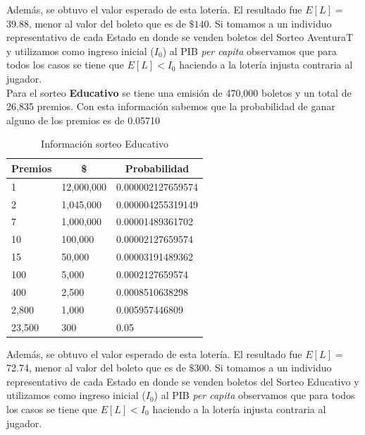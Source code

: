 Además, se obtuvo el valor esperado de esta lotería. El resultado fue $E[L] =$ 39.88, menor al valor del boleto que es de $\$ 140$. Si tomamos a un individuo representativo de cada Estado en donde se venden boletos del Sorteo AventuraT y utilizamos como ingreso inicial ($I_0$) al PIB \textit{per capita} observamos que para todos los casos se tiene que $E[L] < I_0$ haciendo a la lotería injusta contraria al jugador. \\

Para el sorteo \textbf{Educativo} se tiene una emisión de 470,000 boletos y un total de 26,835 premios. Con esta información sabemos que la probabilidad de ganar alguno de los premios es de 0.05710

\begin{table}[H]
\centering
\caption{Información sorteo Educativo}
\label{tab:educ}
\begin{tabular}{@{}lll@{}}
\toprule
\multicolumn{1}{c}{Premios} & \multicolumn{1}{c}{\$} & \multicolumn{1}{c}{Probabilidad} \\ \midrule
1                           & 12,000,000               & 0.000002127659574                \\
2                           & 1,045,000                & 0.000004255319149                \\
7                           & 1,000,000                & 0.00001489361702                 \\
10                          & 100,000                 & 0.00002127659574                 \\
15                          & 50,000                  & 0.00003191489362                 \\
100                         & 5,000                   & 0.0002127659574                  \\
400                         & 2,500                   & 0.0008510638298                  \\
2,800                        & 1,000                   & 0.005957446809                   \\
23,500                       & 300                    & 0.05                             \\ \bottomrule
\end{tabular}
\end{table}

Además, se obtuvo el valor esperado de esta lotería. El resultado fue $E[L] = $ 72.74, menor al valor del boleto que es de $\$ 300$. Si tomamos a un individuo representativo de cada Estado en donde se venden boletos del Sorteo Educativo y utilizamos como ingreso inicial ($I_0$) al PIB \textit{per capita} observamos que para todos los casos se tiene que $E[L] < I_0$ haciendo a la lotería injusta contraria al jugador. \\


